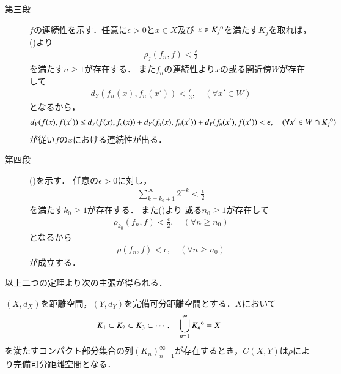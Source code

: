 \begin{prf}
\begin{description}
			\item[第三段]
				$f$の連続性を示す．任意に$\epsilon > 0$と$x \in X$及び
				$x \in {\kern0ptK_j}^{\mathrm{o}}$を満たす$K_j$を取れば，
				()より
				\begin{align}
					\rho_j(f_n,f) < \frac{\epsilon}{3}
				\end{align}
				を満たす$n \geq 1$が存在する．
				また$f_n$の連続性より$x$の或る開近傍$W$が存在して
				\begin{align}
					d_Y(f_n(x),f_n(x')) < \frac{\epsilon}{3},
					\quad (\forall x' \in W)
				\end{align}
				となるから，
				\begin{align}
					d_Y(f(x),f(x'))
					\leq d_Y(f(x),f_n(x)) + d_Y(f_n(x),f_n(x')) + d_Y(f_n(x'),f(x'))
					< \epsilon,
					\quad (\forall x' \in W \cap {\kern0ptK_j}^{\mathrm{o}})
				\end{align}
				が従い$f$の$x$における連続性が出る．
			
			\item[第四段]
				()を示す．
				任意の$\epsilon > 0$に対し，
				\begin{align}
					\sum_{k=k_0+1}^\infty 2^{-k} < \frac{\epsilon}{2}
				\end{align}
				を満たす$k_0 \geq 1$が存在する．
				また()より
				或る$n_0 \geq 1$が存在して
				\begin{align}
					\rho_{k_0}(f_n,f) < \frac{\epsilon}{2},
					\quad (\forall n \geq n_0)
				\end{align}
				となるから
				\begin{align}
					\rho(f_n,f) < \epsilon, \quad (\forall n \geq n_0)
				\end{align}
				が成立する．
				\QED
		\end{description}
	\end{prf}
	
	以上二つの定理より次の主張が得られる．
	\begin{screen}
		\begin{thm}[$C(X,Y)$の完備可分性]\label{thm:appendix_complete_separability_of_spaces_of_continuous_functions}
			$(X,d_X)$を距離空間，$(Y,d_Y)$を完備可分距離空間とする．$X$において
			\begin{align}
				K_1 \subset K_2 \subset K_3 \subset \cdots,
				\quad \bigcup_{n=1}^\infty {\kern0ptK_n}^{\mathrm{o}} = X
			\end{align}
			を満たすコンパクト部分集合の列$(K_n)_{n=1}^\infty$が存在するとき，$C(X,Y)$は$\rho$により完備可分距離空間となる．
		\end{thm}
	\end{screen}
	
